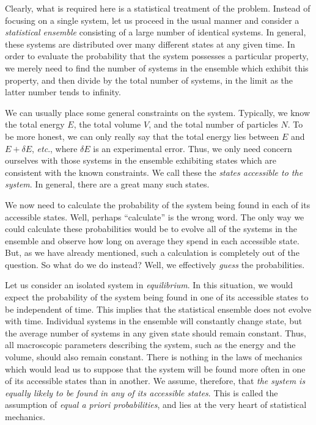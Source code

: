 Clearly, what is required here is a statistical treatment of the problem.
Instead of focusing on a single system, let us proceed in the usual
manner and consider a {\em statistical
ensemble}\/ consisting of a large number of identical systems. 
In general, these systems
 are distributed over many different states at any given time.
 In order to evaluate the probability
that the system possesses a particular property, we merely need to  find the number of
systems in the ensemble which exhibit this property, and then divide by the total
number of systems, in the limit as the latter number tends to infinity.

We can usually place some general constraints  on the system.
Typically, we know the total energy $E$, the total volume $V$, and the 
total number of particles $N$. To be more honest, we can only
really say that the total energy lies between $E$ and $E+\delta E$, {\em etc}., where
$\delta E$ is an experimental error. Thus, we only need concern ourselves with
those systems in the ensemble exhibiting  states which are consistent with the 
known constraints. We call these the {\em states accessible to the system}. 
In general, there are a great many such states.

We now need to calculate the probability of the system being found in 
each  of its accessible states. Well, perhaps ``calculate'' is the wrong word. 
The only way we could calculate these  probabilities would be to evolve all of the
systems in the ensemble and observe how long on average they spend in each
accessible state. But, as we have already mentioned, such a calculation is completely
out of the question.
 So what do we do instead? Well,   we effectively {\em guess}\/ the
probabilities. 

Let us consider an isolated system in {\em equilibrium}. In this situation,
 we would expect
 the probability of the system being found in one of its accessible
states to be independent of time. This implies that the statistical ensemble 
does not 
evolve with time. Individual systems in the ensemble will constantly
 change state, but the
average number of systems in any given state should remain constant. Thus, all
macroscopic parameters describing the system, such as the energy
and the volume,  should also remain constant. There is nothing in the laws of
mechanics which would lead us to suppose that the system will be found more
often in one of its accessible states than in another. We assume,
therefore, that {\em the system is equally likely to be found in any  of
its accessible states}. This is called the assumption of {\em equal
a priori probabilities}, and lies at the very heart of statistical mechanics.

